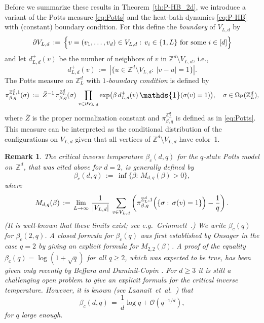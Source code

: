 \documentclass{dis}
\newtheorem{remark}[theorem]{Remark}
\theoremstyle{citing}
\begin{document}
Before we summarize these results in Theorem~\ref{th:P-HB_2d}, we 
introduce a variant of the Potts measure \eqref{eq:Potts} and 
the heat-bath dynamics \eqref{eq:P-HB} with (constant) 
boundary condition. 
For this define the \emph{boundary} 
of $V_{L,d}$ by 
\[
\partial V_{L,d} \,:=\, \Bigl\{v=(v_1,\dots,v_d)\in V_{L,d}:\, 
v_i\in\{1,L\} \text{ for some } i\in[d]\Bigr\}
\]
and let $d_{L,d}^{+}(v)$ be the number of neighbors of $v$ in 
${\ensuremath{\mathbb{Z}}}^d\setminus V_{L,d}$, i.e., 
\[
d_{L,d}^{+}(v) \,:=\, 
{\left\vert {\bigl\{u\in{\ensuremath{\mathbb{Z}}}^d\setminus V_{L,d}:\ {\left\vert {v-u} \right\vert}=1\bigr\}} \right\vert}.
\]
The
Potts measure on ${\ensuremath{\mathbb{Z}}}_L^d$ with \emph{$1$-boundary condition} 
is defined by 
\begin{equation}\label{eq:Potts_boundary}
\pi^{{\ensuremath{\mathbb{Z}}}_L^d,1}_{\beta,q}(\sigma) 
\,:=\, \bar{Z}^{-1}\,\pi^{{\ensuremath{\mathbb{Z}}}_L^d}_{\beta,q}(\sigma)\,
\prod_{v\in\partial V_{L,d}} \exp\bigl(\beta\, 
d_{L,d}^{+}(v)\,{\scalebox{1.2}{\raisebox{-0.2mm}{$\mathds{1}$}}}(\sigma(v)=1)
\bigr),
\quad \sigma\in{{\Omega}_{\rm P}}({\ensuremath{\mathbb{Z}}}_L^d), 
\end{equation}
where 
$\bar{Z}$ is the proper 
normalization constant and $\pi^{{\ensuremath{\mathbb{Z}}}_L^d}_{\beta,q}$ is defined as 
in \eqref{eq:Potts}.
This measure can be interpreted as the conditional distribution 
of the configurations on $V_{L,d}$ given that all vertices of 
${\ensuremath{\mathbb{Z}}}^d\setminus V_{L,d}$ have color~1. 

\begin{remark}\label{remark:critical}
The critical inverse temperature $\beta_c(d,q)$ 
for the $q$-state Potts model on~${\ensuremath{\mathbb{Z}}}^d$, 
that was cited above for $d=2$, is generally defined by
\begin{equation}\label{eq:critical}
\beta_c(d,q) \,:=\, \inf\{\beta:\, M_{d,q}(\beta)>0\},
\end{equation}
where 
\[
M_{d,q}(\beta) \,:=\, \lim_{L\to\infty}\, 
\frac{1}{{\left\vert {V_{L,d}} \right\vert}}\,\sum_{v\in V_{L,d}}
\left(\pi^{{\ensuremath{\mathbb{Z}}}_L^d,1}_{\beta,q}
\Bigl(\{\sigma:\,\sigma(v)=1\}\Bigr)-\frac1q\right).
\]
(It is well-known that these limits exist; see e.g.~Grimmett~\cite{G1}.)
We write $\beta_c(q)$ for $\beta_c(2,q)$. 
A closed formula for $\beta_c(q)$ was first established by 
Onsager \cite{Onsager} in the case $q=2$ by giving 
an explicit formula for $M_{2,2}(\beta)$. A proof of the equality 
$\beta_c(q)=\log(1+\sqrt{q})$ for all $q\ge2$, 
which was expected to be true, has been given only 
recently by Beffara and Duminil-Copin \cite{BDC}. 
For $d\ge3$ it is still a challenging open problem to give 
an explicit formula for the critical inverse temperature.
However, it is known (see Laanait~et~al.~\cite{LaanaitMMRS}) that 
\[
\beta_c(d,q) \,=\, \frac{1}{d} \log q + \mathcal{O}(q^{-1/d}), 
\]
for $q$ large enough.
\end{remark}
\end{document}

